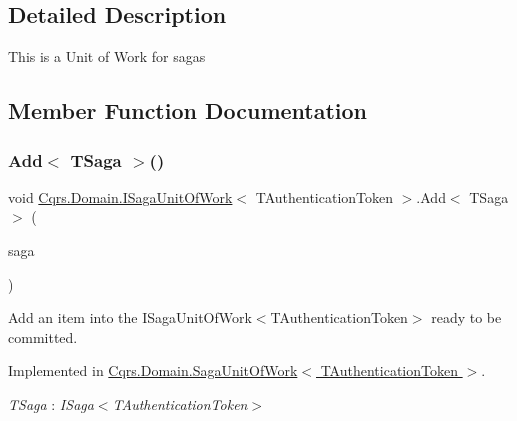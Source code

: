 \subsection{Detailed Description}
This is a Unit of Work for sagas 



\subsection{Member Function Documentation}
\mbox{\label{interfaceCqrs_1_1Domain_1_1ISagaUnitOfWork_a5e7c8e18a8d71fc915db48fac00e7da4}} 
\subsubsection{\texorpdfstring{Add$<$ T\+Saga $>$()}{Add< TSaga >()}}
{\footnotesize\ttfamily void \hyperlink{interfaceCqrs_1_1Domain_1_1ISagaUnitOfWork}{Cqrs.\+Domain.\+I\+Saga\+Unit\+Of\+Work}$<$ T\+Authentication\+Token $>$.Add$<$ T\+Saga $>$ (\begin{DoxyParamCaption}\item[{T\+Saga}]{saga }\end{DoxyParamCaption})}



Add an item into the I\+Saga\+Unit\+Of\+Work$<$\+T\+Authentication\+Token$>$ ready to be committed. 



Implemented in \hyperlink{classCqrs_1_1Domain_1_1SagaUnitOfWork_af62fee98e76ec58ec4d684b36eb7b20e}{Cqrs.\+Domain.\+Saga\+Unit\+Of\+Work$<$ T\+Authentication\+Token $>$}.

\begin{Desc}
\item[Type Constraints]\begin{description}
\item[{\em T\+Saga} : {\em I\+Saga$<$T\+Authentication\+Token$>$}]\end{description}
\end{Desc}
\mbox{\label{interfaceCqrs_1_1Domain_1_1ISagaUnitOfWork_aaa8a63b5304c837deec8a0103eb702f7}} 
